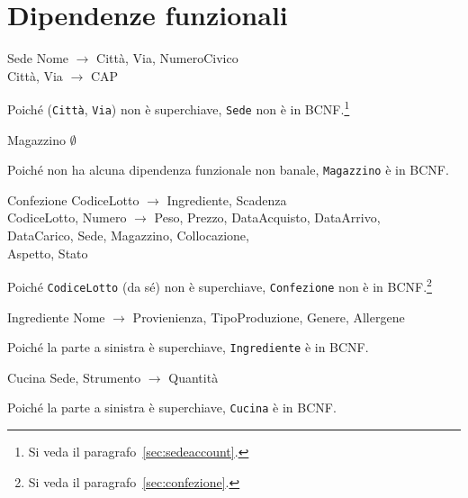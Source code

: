\section{Dipendenze funzionali}\label{sec:functionaldependencies}
\begin{samepage}
\begin{funcdep}{Sede}
    Nome $\to$ Città, Via, NumeroCivico\\
    Città, Via $\to$ CAP
\end{funcdep}
Poiché ({\tt Città}, {\tt Via}) non è superchiave, {\tt Sede} non
è in BCNF.\footnote{Si veda il paragrafo~\vref{sec:sedeaccount}.}
\end{samepage}

\begin{samepage}
\begin{funcdep}{Magazzino}
    $\emptyset$
\end{funcdep}
Poiché non ha alcuna dipendenza funzionale non banale, {\tt Magazzino} è in BCNF.
\end{samepage}

\begin{samepage}
\begin{funcdep}{Confezione}
    CodiceLotto $\to$ Ingrediente, Scadenza\\
    CodiceLotto, Numero $\to$ Peso, Prezzo, DataAcquisto, DataArrivo,\\
        \indent\indent\indent\indent\indent DataCarico, Sede, Magazzino, Collocazione,\\
        \indent\indent\indent\indent\indent Aspetto, Stato
\end{funcdep}
Poiché {\tt CodiceLotto} (da sé) non è superchiave, {\tt Confezione} non è in BCNF.\footnote{Si veda il paragrafo~\vref{sec:confezione}.}
\end{samepage}

\begin{samepage}
\begin{funcdep}{Ingrediente}
    Nome $\to$ Provienienza, TipoProduzione, Genere, Allergene
\end{funcdep}
Poiché la parte a sinistra è superchiave, {\tt Ingrediente} è in BCNF.
\end{samepage}

\begin{samepage}
\begin{funcdep}{Cucina}
    Sede, Strumento $\to$ Quantità
\end{funcdep}
Poiché la parte a sinistra è superchiave, {\tt Cucina} è in BCNF.
\end{samepage}

